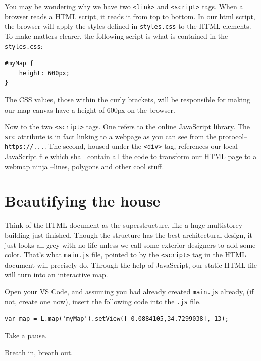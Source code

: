 \documentclass[
]{book}
\begin{document}
You may be wondering why we have two \texttt{\textless{}link\textgreater{}} and \texttt{\textless{}script\textgreater{}} tags. When a browser reads a HTML script, it reads it from top to bottom. In our html script, the browser will apply the styles defined in \texttt{styles.css} to the HTML elements. To make matters clearer, the following script is what is contained in the \texttt{styles.css}:

\begin{verbatim}
#myMap { 
    height: 600px; 
}
\end{verbatim}

The CSS values, those within the curly brackets, will be responsible for making our map canvas have a height of 600px on the browser.

Now to the two \texttt{\textless{}script\textgreater{}} tags. One refers to the online JavaScript library. The \texttt{src} attribute is in fact linking to a webpage as you can see from the protocol-- \texttt{https://...}. The second, housed under the \texttt{\textless{}div\textgreater{}} tag, references our local JavaScript file which shall contain all the code to transform our HTML page to a webmap ninja --lines, polygons and other cool stuff.

\hypertarget{beautifying-the-house}{%
\section{Beautifying the house}\label{beautifying-the-house}}

Think of the HTML document as the superstructure, like a huge multistorey building just finished. Though the structure has the best architectural design, it just looks all grey with no life unless we call some exterior designers to add some color. That's what \texttt{main.js} file, pointed to by the \texttt{\textless{}script\textgreater{}} tag in the HTML document will precisely do. Through the help of JavaScript, our static HTML file will turn into an interactive map.

Open your VS Code, and assuming you had already created \texttt{main.js} already, (if not, create one now), insert the following code into the \texttt{.js} file.

\begin{verbatim}
var map = L.map('myMap').setView([-0.0884105,34.7299038], 13);
\end{verbatim}

Take a pause.

Breath in, breath out.
\end{document}

